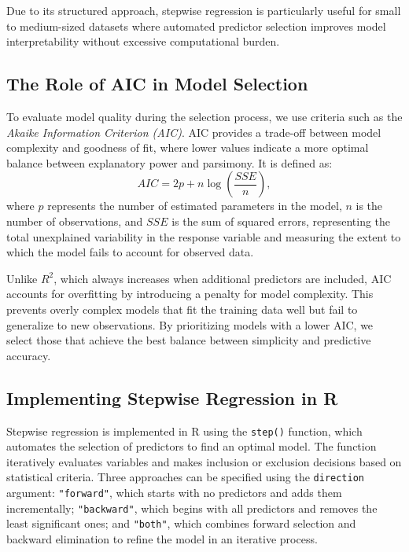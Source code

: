 \documentclass[
  11pt,
]{book}
\theoremstyle{definition}
\theoremstyle{definition}
\theoremstyle{definition}
\theoremstyle{definition}
\theoremstyle{remark}
\begin{document}
Due to its structured approach, stepwise regression is particularly useful for small to medium-sized datasets where automated predictor selection improves model interpretability without excessive computational burden.

\subsection*{The Role of AIC in Model Selection}\label{the-role-of-aic-in-model-selection}


To evaluate model quality during the selection process, we use criteria such as the \emph{Akaike Information Criterion (AIC)}. AIC provides a trade-off between model complexity and goodness of fit, where lower values indicate a more optimal balance between explanatory power and parsimony. It is defined as:\\
\[
AIC = 2p + n \log\left(\frac{SSE}{n}\right),
\]
where \(p\) represents the number of estimated parameters in the model, \(n\) is the number of observations, and \(SSE\) is the sum of squared errors, representing the total unexplained variability in the response variable and measuring the extent to which the model fails to account for observed data.

Unlike \(R^2\), which always increases when additional predictors are included, AIC accounts for overfitting by introducing a penalty for model complexity. This prevents overly complex models that fit the training data well but fail to generalize to new observations. By prioritizing models with a lower AIC, we select those that achieve the best balance between simplicity and predictive accuracy.

\subsection*{Implementing Stepwise Regression in R}\label{implementing-stepwise-regression-in-r}


Stepwise regression is implemented in R using the \texttt{step()} function, which automates the selection of predictors to find an optimal model. The function iteratively evaluates variables and makes inclusion or exclusion decisions based on statistical criteria. Three approaches can be specified using the \texttt{direction} argument: \texttt{"forward"}, which starts with no predictors and adds them incrementally; \texttt{"backward"}, which begins with all predictors and removes the least significant ones; and \texttt{"both"}, which combines forward selection and backward elimination to refine the model in an iterative process.
\end{document}

